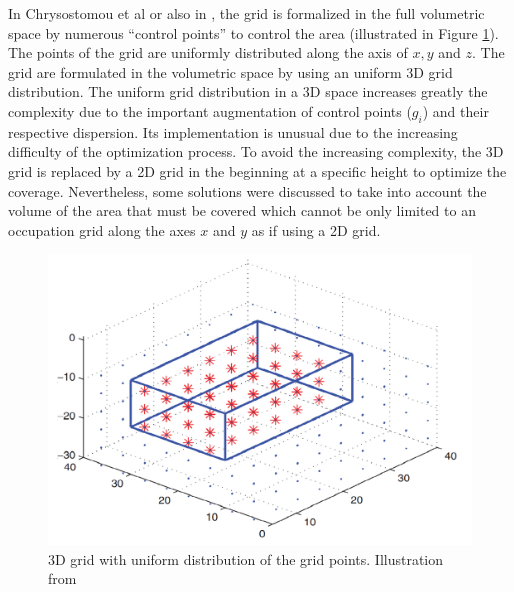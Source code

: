 In Chrysostomou et al \cite{82*chrysostomou2012} or also in \cite{226*nazarzehi2018}, the grid is formalized in the full volumetric space by numerous “control points” to control the area (illustrated in Figure \ref{fig:3Dgridfrom226}). The points of the grid are uniformly distributed along the axis of $x, y$ and $z$. The grid are formulated in the volumetric space by using an uniform 3D grid distribution.
The uniform grid distribution in a 3D space increases greatly the complexity  due to the important augmentation of control points ($g_i$) and their respective dispersion. Its implementation is unusual due to the increasing difficulty of the optimization process. 
To avoid the increasing complexity, the 3D grid is replaced by a  2D grid in the beginning at a specific height to optimize the coverage. 
Nevertheless, some solutions were discussed \citep{141*akbarzadeh2013,83*van2009} to take into account the volume of the area that must be covered which cannot be only limited to an occupation grid along the axes $ x $ and $ y $ as if using a 2D grid.
\begin{figure}[t!]
\begin{center}
   \includegraphics[width=\linewidth]{img/3DgridFrom226.png}
  \caption{3D grid with uniform distribution of the grid points. Illustration from \cite{226*nazarzehi2018} }\label{fig:3Dgridfrom226}
  \endminipage\hfill
  \end{center}
\end{figure}

